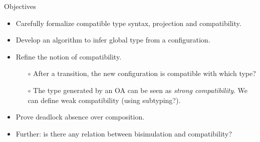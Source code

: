 \begin{frame}{Objectives}

  \begin{itemize}
    \item Carefully formalize compatible type syntax, projection and compatibility.
    \item Develop an algorithm to infer global type from a configuration.
    \item Refine the notion of compatibility.
          \begin{itemize}
            \item [$\circ$] After a transition, the new configuration is compatible with which type?
            \item [$\circ$] The type generated by an OA can be seen as \textit{strong compatibility}. We can define weak compatibility (using subtyping?).
          \end{itemize}
    \item Prove deadlock absence over composition.
    \item Further: is there any relation between bisimulation and compatibility?
  \end{itemize}
\end{frame}
